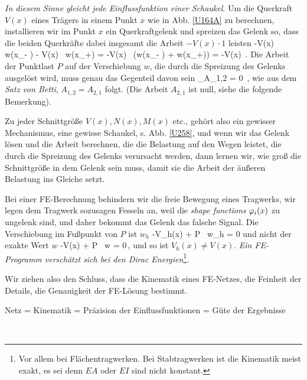{\em In diesem Sinne gleicht jede Einflussfunktion einer Schaukel\/}. Um die Querkraft $V(x)$ eines Tr\"{a}gers in einem Punkt $x$ wie in Abb.  \ref{U164A}  zu berechnen, installieren wir im Punkt $x$ ein Querkraftgelenk und spreizen das Gelenk so, dass die beiden Querkr\"{a}fte dabei insgesamt die Arbeit $- V(x) \cdot 1$ leisten
\beq
-V(x) \, w(x_{-} ) - V(x) \, w(x_{+}) = -V(x) \, (w(x_{-} )
 + w(x_{+})) = -V(x) \,.
\eeq
Die Arbeit der Punktlast $P$ auf der Verschiebung $w$, die durch die Spreizung des Gelenks ausgel\"{o}st wird, muss genau das Gegenteil davon sein
\beq
{}_{A_{1,2}} = 0 \,,
\eeq
wie aus dem {\em Satz von Betti\/}, $A_{1,2} = A_{2,1}$ folgt. (Die Arbeit $A_{2,1}$ ist null, siehe die folgende Bemerkung).


Zu jeder Schnittgr\"{o}{\ss}e $V(x), N(x), M(x)$ etc., geh\"{o}rt also ein gewisser Mechanismus, eine gewisse Schaukel, s. Abb. \ref{U258}, und wenn wir das Gelenk l\"{o}sen und die Arbeit berechnen, die die Belastung auf den Wegen leistet, die durch die Spreizung des Gelenks verursacht werden, dann lernen wir, wie gro{\ss} die Schnittgr\"{o}{\ss}e in dem Gelenk sein muss, damit sie die Arbeit der \"{a}u{\ss}eren Belastung ins Gleiche setzt.

Bei einer FE-Berechnung behindern wir die freie Bewegung eines Tragwerks, wir legen dem Tragwerk sozusagen Fesseln an, weil die {\em shape functions\/} $\varphi_i(x)$ zu \glq ungelenk\grq{} sind, und daher bekommt das Gelenk das falsche Signal. Die Verschiebung im Fu{\ss}punkt von $P$ ist $w_h$
\beq
-V_h(x)  + P \, w_h = 0
\eeq
und nicht der exakte Wert $w$
\beq
-V(x)   + P \, w = 0\,,
\eeq
und so ist $V_h(x) \neq V(x)$. {\em Ein FE-Programm versch\"{a}tzt sich bei den Dirac Energien\/}\footnote{Vor allem bei Fl\"{a}chentragwerken. Bei Stabtragwerken ist die Kinematik meist exakt, es sei denn $EA$ oder $EI$ sind nicht konstant.}.

Wir ziehen also den Schluss, dass die Kinematik eines FE-Netzes, die Feinheit der Details, die Genauigkeit der FE-L\"{o}sung bestimmt.\\

\hspace*{-12pt}\colorbox{highlightBlue}{\parbox{0.98\textwidth}{Netz = Kinematik = Pr\"{a}zision der Einflussfunktionen = G\"{u}te der Ergebnisse}}\\

